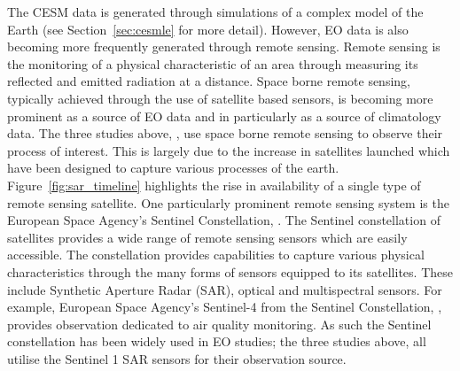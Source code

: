 The CESM data is generated through simulations of a complex model of the Earth (see Section~\ref{sec:cesmle} for more detail).
However, EO data is also becoming more frequently generated through remote sensing.
Remote sensing is the monitoring of a physical characteristic of an area through measuring its reflected and emitted radiation at a distance. 
Space borne remote sensing, typically achieved through the use of satellite based sensors, is becoming more prominent as a source of EO data and in particularly as a source of climatology data.
The three studies above, \citep{muro_short-term_2016, raspini_continuous_2018, khabbazan_crop_2019}, use space borne remote sensing to observe their process of interest. 
This is largely due to the increase in satellites launched which have been designed to capture various processes of the earth.
Figure~\ref{fig:sar_timeline} highlights the rise in availability of a single type of remote sensing satellite.
One particularly prominent remote sensing system is the European Space Agency's Sentinel Constellation, \cite{aschbacher_european_2012}.
The Sentinel constellation of satellites provides a wide range of remote sensing sensors which are easily accessible.
The constellation provides capabilities to capture various physical characteristics through the many forms of sensors equipped to its satellites.
These include  Synthetic Aperture Radar (SAR), optical and multispectral sensors.
For example, European Space Agency's Sentinel-4 from the Sentinel Constellation, \cite{aschbacher_european_2012}, provides observation dedicated to air quality monitoring.
As such the Sentinel constellation has been widely used in EO studies; the three studies above, \citep{muro_short-term_2016, khabbazan_crop_2019, raspini_continuous_2018}  all utilise the Sentinel 1 SAR sensors for their observation source. 

